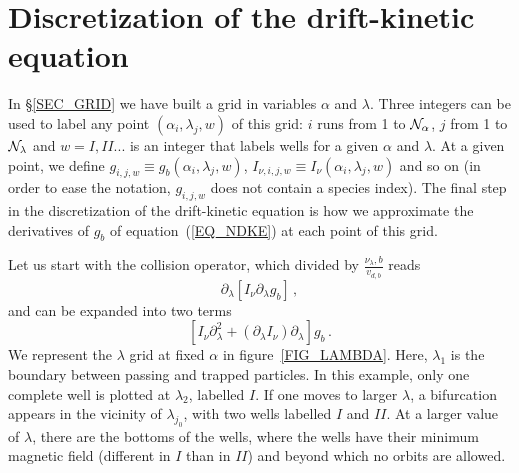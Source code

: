 
\section{Discretization of the drift-kinetic equation}\label{SEC_SOLDKE}


In \S\ref{SEC_GRID} we have built a grid in variables $\alpha$ and $\lambda$. Three integers can be used to label any point $(\alpha_i,\lambda_j,w)$ of this grid: $i$ runs from 1 to  ${\cal{N}}_\alpha$,  $j$ from 1 to ${\cal{N}}_\lambda$ and $w=I,II...$ is an integer that labels wells for a given $\alpha$ and $\lambda$. At a given point, we define $g_{i,j,w}\equiv g_b(\alpha_i,\lambda_j,w)$,  $I_{\nu,i,j,w}\equiv I_\nu(\alpha_i,\lambda_j,w)$ and so on (in order to ease the notation, $g_{i,j,w}$ does not contain a species index). The final step in the discretization of the drift-kinetic equation is how we approximate the derivatives of $g_b$ of equation~(\ref{EQ_NDKE}) at each point of this grid.


Let us start with the collision operator, which divided by $ \frac{\nu_{\lambda},b}{v_{d,b}}$ reads
\begin{equation}
\partial_\lambda\left[ I_\nu \partial_\lambda g_b\right]\,,
\label{EQ_COL}
\end{equation}
and can be expanded into two terms
\begin{equation}
\left[ I_\nu \partial^2_\lambda  + (\partial_\lambda I_\nu) \partial_\lambda \right] g_b\,. 
\label{EQ_CO_EXP}
\end{equation}
We represent the $\lambda$ grid at fixed $\alpha$ in figure~\ref{FIG_LAMBDA}. Here, $\lambda_1$ is the boundary between passing and trapped particles. In this example, only one complete well is plotted at $\lambda_2$, labelled $I$. If one moves to larger $\lambda$, a bifurcation appears in the vicinity of $\lambda_{j_0}$, with two wells labelled $I$ and $II$. At a larger value of $\lambda$, there are the bottoms of the wells, where the wells have their minimum magnetic field (different in $I$ than in $II$) and beyond which no orbits are allowed.

